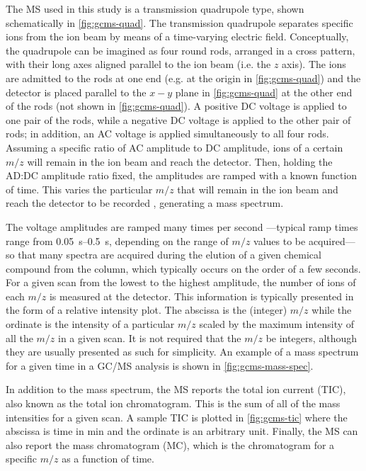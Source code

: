 \documentclass[../main.tex]{subfiles}
\begin{document}
The MS used in this study is a transmission quadrupole type, shown
schematically in \cref{fig:gcms-quad}. The transmission quadrupole separates
specific ions from the ion beam by
means of a time-varying electric field. Conceptually, the quadrupole
can be imagined as four round rods, arranged in a cross pattern, with
their long axes aligned parallel to the ion beam (i.e. the $z$ axis).
The ions are admitted to the rods at one end (e.g. at the origin in
\cref{fig:gcms-quad}) and the detector is placed parallel to the $x-y$ plane
in \cref{fig:gcms-quad} at the other end of the rods (not shown in
\cref{fig:gcms-quad}). A positive DC voltage is applied
to one pair of the rods, while a negative DC voltage is applied to the other
pair of rods; in addition, an AC voltage is applied simultaneously to all four
rods. Assuming a specific ratio of AC amplitude to DC amplitude, ions of a certain
$m/z$ will remain in the ion beam and reach the detector.
Then, holding the AD:DC amplitude ratio fixed, the amplitudes are ramped with a known
function of time. This varies the particular $m/z$ that will remain in the ion beam
and reach the detector to be recorded \cite{Sparkman2011}, generating a mass spectrum.

The voltage amplitudes are ramped many times per second%
---typical ramp times range from \SIrange{0.05}{0.5}{\second},
depending on the range of $m/z$ values to be acquired---so that many
spectra are acquired during the elution of a given chemical compound
from the column, which typically occurs on the order of a few seconds.
For a given scan from the lowest to the highest amplitude, the number of ions
of each $m/z$ is measured at the detector. This information is
typically presented in the form of a relative intensity plot. The abscissa
is the (integer) $m/z$ while the ordinate is the intensity of a particular
$m/z$ scaled by the maximum intensity of all the $m/z$ in a given scan. It
is not required that the $m/z$ be integers, although they are usually presented
as such for simplicity. An example of a mass spectrum for a given time in a
GC/MS analysis is shown in \cref{fig:gcms-mass-spec}.

In addition to the mass spectrum, the MS reports the total ion current (TIC),
also known as the total ion chromatogram. This is the sum of all of the mass
intensities for a given scan. A sample TIC is plotted in \cref{fig:gcms-tic}
where the abscissa is time in \si{\minute} and the ordinate is an arbitrary unit.
Finally, the MS can also report the mass chromatogram (MC), which is the
chromatogram for a specific $m/z$ as a function of time.
\end{document}
